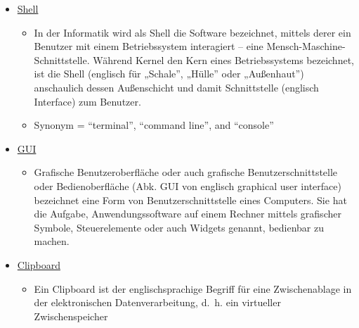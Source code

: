 \documentclass[
]{article}
\providecommand{\tightlist}{%
  \setlength{\itemsep}{0pt}\setlength{\parskip}{0pt}}
\begin{document}
\begin{itemize}
\item
  \href{https://de.wikipedia.org/wiki/Shell_(Betriebssystem)}{Shell}

  \begin{itemize}
  \tightlist
  \item
    In der Informatik wird als Shell die Software bezeichnet,
    mittels derer ein Benutzer mit einem Betriebssystem interagiert
    -- eine Mensch-Maschine-Schnittstelle. Während Kernel den Kern
    eines Betriebssystems bezeichnet, ist die Shell (englisch für
    „Schale'', „Hülle'' oder „Außenhaut'') anschaulich dessen
    Außenschicht und damit Schnittstelle (englisch Interface) zum
    Benutzer.
  \item
    Synonym = ``terminal'', ``command line'', and ``console''
  \end{itemize}
\item
  \href{https://de.wikipedia.org/wiki/Grafische_BenutzeroberflC3A4che}{GUI}

  \begin{itemize}
  \tightlist
  \item
    Grafische Benutzeroberfläche oder auch grafische
    Benutzerschnittstelle oder Bedienoberfläche (Abk. GUI von
    englisch graphical user interface) bezeichnet eine Form von
    Benutzerschnittstelle eines Computers. Sie hat die Aufgabe,
    Anwendungssoftware auf einem Rechner mittels grafischer Symbole,
    Steuerelemente oder auch Widgets genannt, bedienbar zu machen.
  \end{itemize}
\item
  \href{https://de.wikipedia.org/wiki/Zwischenablage}{Clipboard}

  \begin{itemize}
  \tightlist
  \item
    Ein Clipboard ist der englischsprachige Begriff für eine
    Zwischenablage in der elektronischen Datenverarbeitung, d.~h.
    ein virtueller Zwischenspeicher
  \end{itemize}
\end{itemize}
\end{document}
